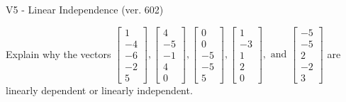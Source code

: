 \begin{exercise}
  \begin{exerciseTitle}V5 - Linear Independence (ver. 602)\end{exerciseTitle}
  \begin{exerciseStatement}
    Explain why the vectors \(\left[\begin{array}{r}
1 \\
-4 \\
-6 \\
-2 \\
5
\end{array}\right] , \left[\begin{array}{r}
4 \\
-5 \\
-1 \\
4 \\
0
\end{array}\right] , \left[\begin{array}{r}
0 \\
0 \\
-5 \\
-5 \\
5
\end{array}\right] , \left[\begin{array}{r}
1 \\
-3 \\
1 \\
2 \\
0
\end{array}\right] , \text{ and } \left[\begin{array}{r}
-5 \\
-5 \\
2 \\
-2 \\
3
\end{array}\right]\) are linearly dependent or linearly independent.	



\end{exerciseStatement}
\end{exercise}
